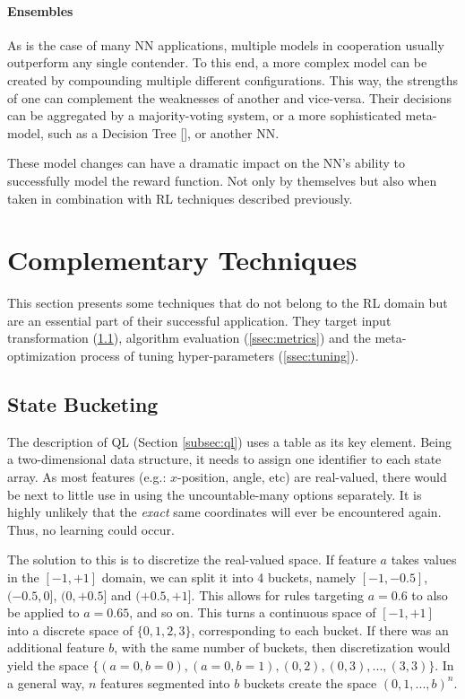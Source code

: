 \documentclass{article}
\begin{document}
\paragraph{Ensembles} As is the case of many NN applications, multiple models in cooperation usually outperform any single contender. To this end, a more complex model can be created by compounding multiple different configurations. This way, the strengths of one can complement the weaknesses of another and vice-versa. Their decisions can be aggregated by a majority-voting system, or a more sophisticated meta-model, such as a Decision Tree [\cite{bishop}], or another NN.

These model changes can have a dramatic impact on the NN's ability to successfully model the reward function. Not only by themselves but also when taken in combination with RL techniques described previously.


\newpage
\section{Complementary Techniques}
\label{sec:compl}

This section presents some techniques that do not belong to the RL domain but are an essential part of their successful application. They target input transformation (\ref{ssec:bucket}), algorithm evaluation (\ref{ssec:metrics}) and the meta-optimization process of tuning hyper-parameters (\ref{ssec:tuning}).

\subsection{State Bucketing}
\label{ssec:bucket}

The description of QL (Section \ref{subsec:ql}) uses a table as its key element. Being a two-dimensional data structure, it needs to assign one identifier to each state array. As most features (e.g.: $x$-position, angle, etc) are real-valued, there would be next to little use in using the uncountable-many options separately. It is highly unlikely that the \textit{exact} same coordinates will ever be encountered again. Thus, no learning could occur. 

The solution to this is to discretize the real-valued space. If feature $a$ takes values in the $[-1, +1]$ domain, we can split it into 4 buckets, namely $[-1, -0.5]$, $(-0.5, 0]$, $(0, +0.5]$ and $(+0.5, +1]$. This allows for rules targeting $a = 0.6$ to also be applied to $a = 0.65$, and so on. This turns a continuous space of $[-1, +1]$ into a discrete space of $\{0, 1, 2, 3\}$, corresponding to each bucket. If there was an additional feature $b$, with the same number of buckets, then discretization would yield the space $\{(a=0, b=0), (a=0, b=1), (0, 2), (0, 3), ..., (3, 3)\}$. In a general way, $n$ features segmented into $b$ buckets create the space $(0, 1, ..., b)^n$.
\end{document}
